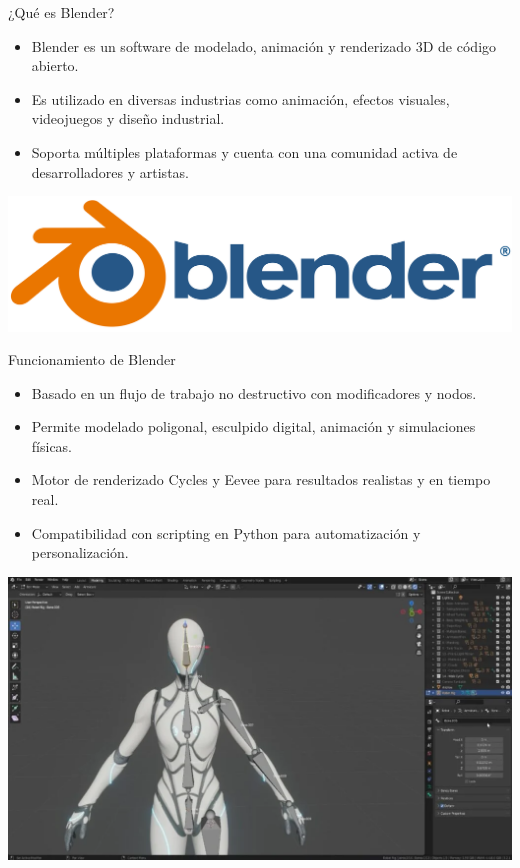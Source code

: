 \begin{frame}{¿Qué es Blender?}
    \begin{itemize}
        \item Blender es un software de modelado, animación y renderizado 3D de código abierto.
        \item Es utilizado en diversas industrias como animación, efectos visuales, videojuegos y diseño industrial.
        \item Soporta múltiples plataformas y cuenta con una comunidad activa de desarrolladores y artistas.
    \end{itemize}
    \begin{center}
        \includegraphics[width=0.6\linewidth]{01_Blender/Logo_Blender.png}
    \end{center}
\end{frame}

\begin{frame}{Funcionamiento de Blender}
    \begin{itemize}
        \item Basado en un flujo de trabajo no destructivo con modificadores y nodos.
        \item Permite modelado poligonal, esculpido digital, animación y simulaciones físicas.
        \item Motor de renderizado Cycles y Eevee para resultados realistas y en tiempo real.
        \item Compatibilidad con scripting en Python para automatización y personalización.
    \end{itemize}
    \begin{center}
        \includegraphics[width=0.6\linewidth]{01_Blender/blender.png}
    \end{center}
\end{frame}

